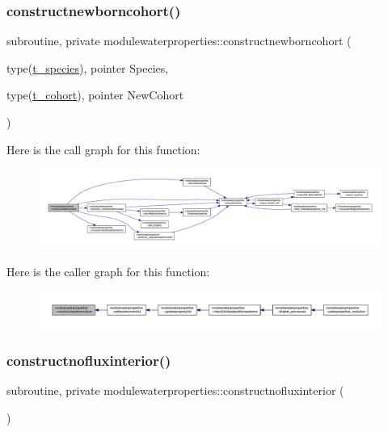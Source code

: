 \subsubsection{\texorpdfstring{constructnewborncohort()}{constructnewborncohort()}}
{\footnotesize\ttfamily subroutine, private modulewaterproperties\+::constructnewborncohort (\begin{DoxyParamCaption}\item[{type(\mbox{\hyperlink{structmodulewaterproperties_1_1t__species}{t\+\_\+species}}), pointer}]{Species,  }\item[{type(\mbox{\hyperlink{structmodulewaterproperties_1_1t__cohort}{t\+\_\+cohort}}), pointer}]{New\+Cohort }\end{DoxyParamCaption})\hspace{0.3cm}{\ttfamily [private]}}

Here is the call graph for this function\+:\nopagebreak
\begin{figure}[H]
\begin{center}
\leavevmode
\includegraphics[width=350pt]{namespacemodulewaterproperties_a6d6a2e31ca36bd79bebb89f3613ed278_cgraph}
\end{center}
\end{figure}
Here is the caller graph for this function\+:\nopagebreak
\begin{figure}[H]
\begin{center}
\leavevmode
\includegraphics[width=350pt]{namespacemodulewaterproperties_a6d6a2e31ca36bd79bebb89f3613ed278_icgraph}
\end{center}
\end{figure}
\mbox{\label{namespacemodulewaterproperties_a1cee571ebf44f0252603c9bd29a100e1}} 
\subsubsection{\texorpdfstring{constructnofluxinterior()}{constructnofluxinterior()}}
{\footnotesize\ttfamily subroutine, private modulewaterproperties\+::constructnofluxinterior (\begin{DoxyParamCaption}{ }\end{DoxyParamCaption})\hspace{0.3cm}{\ttfamily [private]}}

